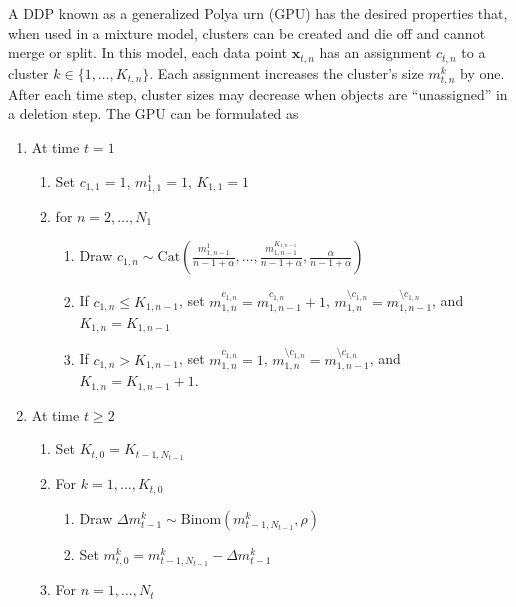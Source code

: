 \documentclass{article}
\begin{document}
A DDP known as a generalized Polya urn (GPU) \cite{caron2007generalized} has the desired properties that, when used in a mixture model, clusters can be created and die off and cannot merge or split. In this model, each data point $\mathbf{x}_{t,n}$ has an assignment $c_{t,n}$ to a cluster $k \in \{1,\ldots,K_{t,n}\}$. Each assignment increases the cluster's size $m_{t,n}^k$ by one. After each time step, cluster sizes may decrease when objects are ``unassigned'' in a deletion step. The GPU can be formulated as
\begin{enumerate}
    \item At time $t=1$
    \begin{enumerate}
        \item Set $c_{1,1}=1$, $m_{1,1}^1=1$, $K_{1,1}=1$
        \item for $n=2,\ldots,N_1$
        \begin{enumerate}
            \item Draw $c_{1,n} \sim 
                \text{Cat}(\frac{m_{1,n-1}^1}{n-1+\alpha},\ldots,\frac{m_{1,n-1}^{K_{1,n-1}}}{n-1+\alpha},\frac{\alpha}{n-1+\alpha})$
            \item If $c_{1,n} \leq K_{1,n-1}$, set 
                $m_{1,n}^{c_{1,n}} = m_{1,n-1}^{c_{1,n}} + 1$, 
                $m_{1,n}^{\setminus c_{1,n}}= m_{1,n-1}^{\setminus c_{1,n}}$, 
                and $K_{1,n} = K_{1,n-1}$
            \item If $c_{1,n} > K_{1,n-1}$, set 
                $m_{1,n}^{c_{1,n}}=1$, 
                $m_{1,n}^{\setminus c_{1,n}} = m_{1,n-1}^{\setminus c_{1,n}}$, 
                and $K_{1,n}=K_{1,n-1}+1$.
        \end{enumerate}
    \end{enumerate}
    \item At time $t \geq 2$
    \begin{enumerate}
        \item Set $K_{t,0} = K_{t-1,N_{t-1}}$
        \item For $k=1,\ldots,K_{t,0}$
        \begin{enumerate}
            \item Draw $\Delta m_{t-1}^k \sim \text{Binom}(m_{t-1,N_{t-1}}^k,\rho)$
            \item Set $m_{t,0}^k = m_{t-1,N_{t-1}}^k - \Delta m_{t-1}^k$
        \end{enumerate}
        \item For $n=1,\ldots,N_t$
        \begin{enumerate}

\end{enumerate}
\end{enumerate}
\end{enumerate}
\end{document}
